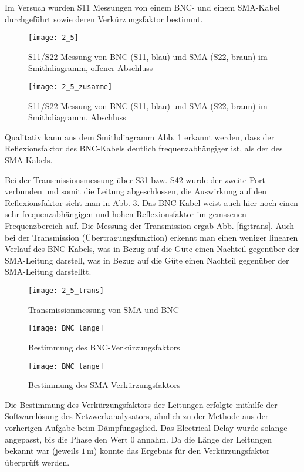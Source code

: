 Im Versuch wurden S11 Messungen von einem BNC- und einem SMA-Kabel durchgeführt sowie deren
Verkürzungsfaktor bestimmt.

\begin{figure}[h]
  \texttt{[image: 2\_5]}
  \caption{S11/S22 Messung von BNC (S11, blau) und SMA (S22, braun) im
    Smithdiagramm, offener Abschluss}
  \label{fig:circly}
\end{figure}

\begin{figure}[h]
  \texttt{[image: 2\_5\_zusamme]}
  \caption{S11/S22 Messung von BNC (S11, blau) und SMA (S22, braun) im
    Smithdiagramm, Abschluss}
  \label{fig:circly_load}
\end{figure}

Qualitativ kann aus dem Smithdiagramm Abb. \ref{fig:circly} erkannt werden, dass
der Reflexionsfaktor des BNC-Kabels deutlich frequenzabhängiger ist, als der des
SMA-Kabels.

Bei der Transmissionsmessung über S31 bzw. S42 wurde der zweite Port
verbunden und somit die Leitung abgeschlossen, die Auswirkung auf den
Reflexionsfaktor sieht man in Abb. \ref{fig:circly_load}. Das BNC-Kabel weist
auch hier noch einen sehr frequenzabhängigen und hohen Reflexionsfaktor im
gemssenen Frequenzbereich auf. Die Messung der Transmission ergab Abb.
\ref{fig:trans}. Auch bei der Transmission (Übertragungsfunktion) erkennt man
einen weniger linearen Verlauf des BNC-Kabels, was in Bezug auf die Güte einen
Nachteil gegenüber der SMA-Leitung darstell, was in Bezug auf die Güte einen
Nachteil gegenüber der SMA-Leitung darstelltt.

\begin{figure}[h]
  \texttt{[image: 2\_5\_trans]}
  \caption{Transmissionmessung von SMA und BNC} 
  \label{fig:circly_load}
\end{figure}

\begin{figure}[h]
  \begin{center}
  \texttt{[image: BNC\_lange]}
  \end{center}
  \caption{Bestimmung des BNC-Verkürzungsfaktors}
  \label{fig:BNC_lange}
\end{figure}
\begin{figure}[h]
  \begin{center}
  \texttt{[image: BNC\_lange]}
  \end{center}
  \caption{Bestimmung des SMA-Verkürzungsfaktors}
  \label{fig:SMA_lange}
\end{figure}

Die Bestimmung des Verkürzungsfaktors der Leitungen erfolgte mithilfe der
Softwarelösung des Netzwerkanalysators, ähnlich zu der Methode aus der
vorherigen Aufgabe beim Dämpfungsglied. Das Electrical Delay wurde solange
angepasst, bis die Phase den Wert $0$ annahm. Da die Länge der Leitungen
bekannt war (jeweils $1 \, \si{\meter}$) konnte das Ergebnis für den
Verkürzungsfaktor überprüft werden.






